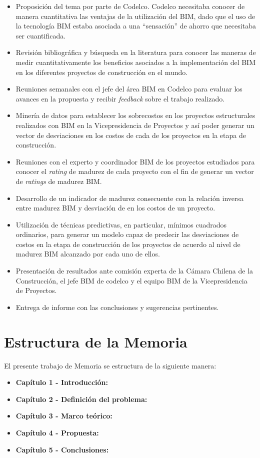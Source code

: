 \begin{itemize}
    \item Proposición del tema por parte de Codelco. Codelco necesitaba conocer de manera cuantitativa las ventajas de la utilización del BIM, dado que el uso de la tecnología BIM estaba asociada a una ``sensación'' de ahorro que necesitaba ser cuantificada.
    \item Revisión bibliográfica y búsqueda en la literatura para conocer las maneras de medir cuantitativamente los beneficios asociados a la implementación del BIM en los diferentes proyectos de construcción en el mundo.
    \item Reuniones semanales con el jefe del área BIM en Codelco para evaluar los avances en la propuesta y recibir \emph{feedback} sobre el trabajo realizado.
    \item Minería de datos para establecer los sobrecostos en los proyectos estructurales realizados con BIM en la Vicepresidencia de Proyectos y así poder generar un vector de desviaciones en los costos de cada de los proyectos en la etapa de construcción.
    \item Reuniones con el experto y coordinador BIM de los proyectos estudiados para conocer el \emph{rating} de madurez de cada proyecto con el fin de generar un vector de \emph{ratings} de madurez BIM.
    \item Desarrollo de un indicador de madurez consecuente con la relación inversa entre madurez BIM y desviación de en los costos de un proyecto.
    \item Utilización de técnicas predictivas, en particular, mínimos cuadrados ordinarios, para generar un modelo capaz de predecir las desviaciones de costos en la etapa de construcción de los proyectos de acuerdo al nivel de madurez BIM alcanzado por cada uno de ellos.
    \item Presentación de resultados ante comisión experta de la Cámara Chilena de la Construcción, el jefe BIM de codelco y el equipo BIM de la Vicepresidencia de Proyectos.
    \item Entrega de informe con las conclusiones y sugerencias pertinentes.
\end{itemize}

\section{Estructura de la Memoria}

El presente trabajo de Memoria se estructura de la siguiente manera:


\begin{itemize}[leftmargin=*]
    \item \textbf{Capítulo 1 - Introducción:}
    \item \textbf{Capítulo 2 - Definición del problema:}
    \item \textbf{Capítulo 3 - Marco teórico:}
    \item \textbf{Capítulo 4 - Propuesta:}
    \item \textbf{Capítulo 5 - Conclusiones:}
\end{itemize}
